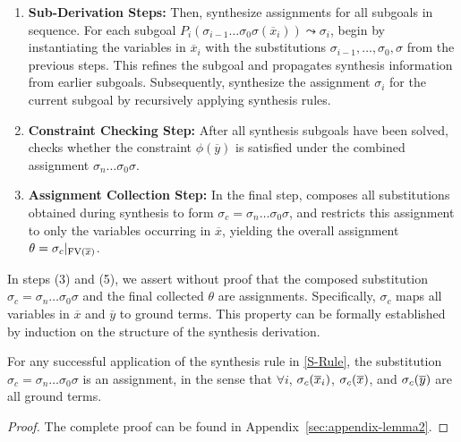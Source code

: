\begin{enumerate}
    \emergencystretch=2em
    \item \textbf{Sub-Derivation Steps:} Then, synthesize assignments for all subgoals in sequence. For each subgoal $P_i(\sigma_{i-1}\ldots\sigma_0\sigma(\overline{x}_i)) \allowbreak\leadsto \sigma_i$, begin by instantiating the variables in $\overline{x}_i$ with the substitutions $\sigma_{i-1}, \ldots, \sigma_0, \sigma$ from the previous steps.
    This refines the subgoal and propagates synthesis information from earlier subgoals. Subsequently, synthesize the assignment $\sigma_i$ for the current subgoal by recursively applying synthesis rules.

    \emergencystretch=0pt
    \item \textbf{Constraint Checking Step:} After all synthesis subgoals have been solved, \mainname checks whether the constraint $\phi(\overline{y})$  is satisfied under the combined assignment $\sigma_n \ldots \sigma_0 \sigma$. 
    
    \item \textbf{Assignment Collection Step:} In the final step, \mainname composes all substitutions obtained during synthesis to form $\sigma_c = \sigma_n \ldots \sigma_0 \sigma$, and restricts this assignment to only the variables occurring in $\overline{x}$, yielding the overall assignment $\theta = \sigma_c|_{\text{FV}(\overline{x})}$. 
\end{enumerate}

In steps (3) and (5), we assert without proof that the composed substitution $\sigma_c = \sigma_n \ldots \sigma_0 \sigma$ and the final collected $\theta$ are assignments. Specifically, $\sigma_c$ maps all variables in $\overline{x}$ and $\overline{y}$ to ground terms. This property can be formally established by induction on the structure of the synthesis derivation.

\begin{lemma}
\label{lemma:assignment}
For any successful application of the synthesis rule in \autoref{S-Rule}, the substitution $\sigma_c = \sigma_n \ldots \sigma_0 \sigma$ is an assignment, in the sense that $\forall i$, $\sigma_c(\overline{x}_i)$, $\sigma_c(\overline{x})$, and $\sigma_c(\overline{y})$ are all ground terms.
\end{lemma}
\begin{proof}
  The complete proof can be found in Appendix~\ref{sec:appendix-lemma2}.
\end{proof}

